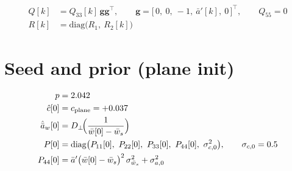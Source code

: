 \documentclass[11pt,a4paper,fontset=none]{ctexart}
\newcommand{\ba}{\bar{a}}
\newcommand{\bw}{\bar{w}}
\newcommand{\ap}{\ba'}
\newcommand{\ah}{\hat{\ba}_w}
\newcommand{\ch}{\hat{c}}
\newcommand{\Dp}{D_{\perp}}
\begin{document}
\begin{align*}
Q[k]      &= Q_{33}[k]\,\mathbf{g}\mathbf{g}^{\top}, \qquad \mathbf{g} = \bigl[\,0,\ 0,\ -1,\ \ap[k],\ 0\,\bigr]^{\top}, \qquad Q_{55} = 0 \\
R[k]      &= \mathrm{diag}\bigl(R_1,\ R_2[k]\bigr)
\end{align*}

\section*{Seed and prior (plane init)}

\begin{align*}
p       &= 2.042 \\
\ch[0]  &= c_{\mathrm{plane}} = +0.037 \\
\ah[0]  &= \Dp\!\Bigl(\frac{1}{\bw[0] - \bw_s}\Bigr) \\
P[0]    &= \mathrm{diag}\bigl(P_{11}[0],\ P_{22}[0],\ P_{33}[0],\ P_{44}[0],\ \sigma_{c,0}^{2}\bigr), \qquad \sigma_{c,0} = 0.5 \\
P_{44}[0] &= \ap\bigl(\bw[0]-\bw_s\bigr)^{2}\,\sigma_{\bw_s}^{2} + \sigma_{a,0}^{2}
\end{align*}
\end{document}
